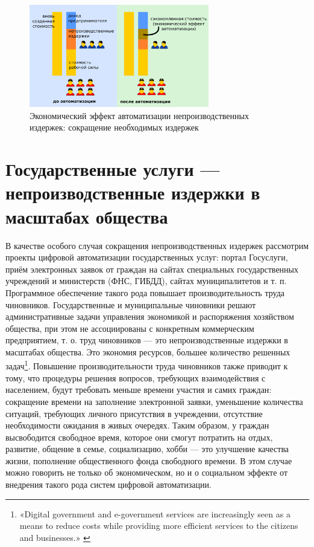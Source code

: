 \documentclass{article}
\begin{document}
\begin{figure}[h]
    \centering
    \includegraphics[width=0.70\textwidth]{effect-nonproduction}
    \caption{Экономический эффект автоматизации непроизводственных издержек: сокращение необходимых издержек}
    \label{fig:effect_nonproduction}
\end{figure}

\section*{Государственные услуги — непроизводственные издержки в масштабах общества}

В качестве особого случая сокращения непроизводственных издержек рассмотрим проекты цифровой автоматизации государственных услуг: портал Госуслуги, приём электронных заявок от граждан на сайтах специальных государственных учреждений и министерств (ФНС, ГИБДД), сайтах муниципалитетов и т. п. Программное обеспечение такого рода повышает производительность труда чиновников. Государственные и муниципальные чиновники решают административные задачи управления экономикой и распоряжения хозяйством общества, при этом не ассоциированы с конкретным коммерческим предприятием, т. о. труд чиновников — это непроизводственные издержки в масштабах общества. Это экономия ресурсов, большее количество решенных задач\footnote{«Digital government and e-government services are increasingly seen as a means to reduce costs while providing more efficient services to the citizens and businesses.» \cite{economicDigitalization2019}}. Повышение производительности труда чиновников также приводит к тому, что процедуры решения вопросов, требующих взаимодействия с населением, будут требовать меньше времени участия и самих граждан: сокращение времени на заполнение электронной заявки, уменьшение количества ситуаций, требующих личного присутствия в учреждении, отсутствие необходимости ожидания в живых очередях. Таким образом, у граждан высвободится свободное время, которое они смогут потратить на отдых, развитие, общение в семье, социализацию, хобби — это улучшение качества жизни, пополнение общественного фонда свободного времени. В этом случае можно говорить не только об экономическом, но и о социальном эффекте от внедрения такого рода систем цифровой автоматизации.
\end{document}

